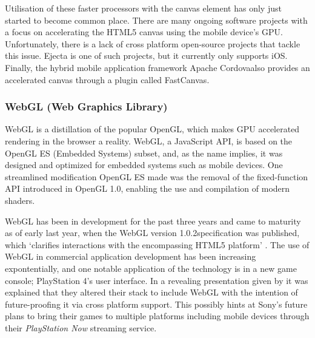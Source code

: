 \documentclass[final]{cmpreport}
\begin{document}
Utilisation of these faster processors with the canvas element has only just started to become common place. There are many ongoing software projects with a focus on accelerating the HTML5 canvas using the mobile device's GPU. Unfortunately, there is a lack of cross platform open-source projects that tackle this issue. Ejecta is one of such projects, but it currently only supports iOS. Finally, the hybrid mobile application framework Apache Cordova\footnotemark also provides an accelerated canvas through a plugin called FastCanvas\footnotemark.


\subsubsection{WebGL (Web Graphics Library)}
WebGL is a distillation of the popular OpenGL, which makes GPU accelerated rendering in the browser a reality. WebGL, a JavaScript API, is based on the OpenGL ES (Embedded Systems) subset, and, as the name implies, it was designed and optimized for embedded systems such as mobile devices. One streamlined modification OpenGL ES made was the removal of the fixed-function API introduced in OpenGL 1.0, enabling the use and compilation of modern shaders.

WebGL has been in development for the past three years and came to maturity as of early last year, when the WebGL version 1.0.2\footnotemark specification was published, which `clarifies interactions with the encompassing HTML5 platform' \citep{Verry}. The use of WebGL in commercial application development has been increasing expontentially, and one notable application of the technology is in a new game console; PlayStation 4's user interface. In a revealing presentation given by \cite{Olmstead} it was explained that they altered their stack to include WebGL with the intention of future-proofing it via cross platform support. This possibly hints at Sony's future plans to bring their games to multiple platforms including mobile devices through their \textit{PlayStation Now} streaming service.\footnotemark

\end{document}
